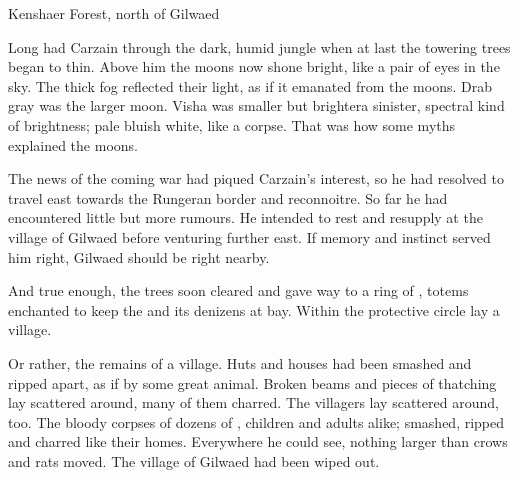 
\stamp
  {\dateSortieFindsTown}
  {Kenshaer Forest, north of Gilwaed}

\begin{comment}
\section{Gilwaed in ruins}
\end{comment}

Long had Carzain \Shachar \travelled through the dark, humid jungle when at last the towering trees began to thin. 
Above him the moons now shone bright, like a pair of eyes in the sky. 
The thick fog reflected their light, as if it emanated from the moons. 
Drab gray \Dun was the larger moon.
Visha was smaller but brighter\dash a sinister, spectral kind of brightness; pale bluish white, like a corpse. 
That was how some myths explained the moons. 

The news of the coming war had piqued Carzain's interest, so he had resolved to travel east towards the Rungeran border and reconnoitre. 
So far he had encountered little but more rumours. 
He intended to rest and resupply at the village of Gilwaed before venturing further east. 
If memory and instinct served him right, Gilwaed should be right nearby. 

And true enough, the trees soon cleared and gave way to a ring of \eidola, totems enchanted to keep the \wylde and its denizens at bay. 
Within the protective circle lay a village. 

Or rather, the remains of a village. 
Huts and houses had been smashed and ripped apart, as if by some great animal. 
Broken beams and pieces of thatching lay scattered around, many of them charred. 
The villagers lay scattered around, too. 
The bloody corpses of dozens of \scathae, children and adults alike; smashed, ripped and charred like their homes. 
Everywhere he could see, nothing larger than crows and rats moved. 
The village of Gilwaed had been wiped out. 



